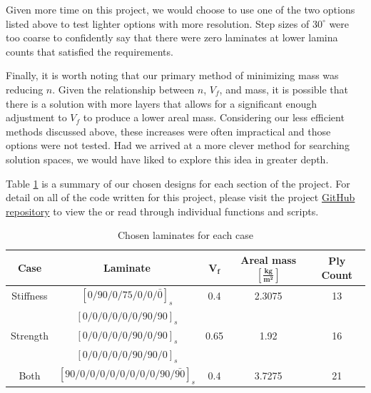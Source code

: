 \documentclass[12pt]{article}
\begin{document}
Given more time on this project, we would choose to use one of the two options listed above to test lighter options with more resolution. Step sizes of $30 ^\circ$ were too coarse to confidently say that there were zero laminates at lower lamina counts that satisfied the requirements. 

Finally, it is worth noting that our primary method of minimizing mass was reducing $n$. Given the relationship between $n$, $V_f$, and mass, it is possible that there is a solution with more layers that allows for a significant enough adjustment to $V_f$ to produce a lower areal mass. Considering our less efficient methods discussed above, these increases were often impractical and those options were not tested. Had we arrived at a more clever method for searching solution spaces, we would have liked to explore this idea in greater depth.

Table \ref{tab:results} is a summary of our chosen designs for each section of the project. For detail on all of the code written for this project, please visit the project \href{https://github.com/brycepfuetze/ASEN-5212-Composites-Project.git}{GitHub repository} to view the  or read through individual functions and scripts.

\begin{table}[H]
    \centering
    \begin{tabular}{|c|c|c|c|c|}
        \hline
        \textbf{Case} & \textbf{Laminate} & $\boldsymbol{V_f}$ & \textbf{Areal mass} $\boldsymbol{[\frac{kg}{m^2}]}$ & \textbf{Ply Count} \\
        \hline
        Stiffness & $[0/90/0/75/0/0/\bar{0}]_s$ & 0.4 & 2.3075 & 13 \\
        \hline
         & $[0/0/0/0/0/0/90/90]_s$ &  & &\\
        Strength & $[0/0/0/0/0/90/0/90]_s$ & 0.65 & 1.92 & 16\\
         & $[0/0/0/0/0/90/90/0]_s$ &  & &\\
        \hline
        Both & $[90/0/0/0/0/0/0/0/0/90/\bar{90}]_s$ & 0.4 & 3.7275 & 21\\
        \hline
    \end{tabular}
    \caption{Chosen laminates for each case}
    \label{tab:results}
\end{table}
\end{document}
